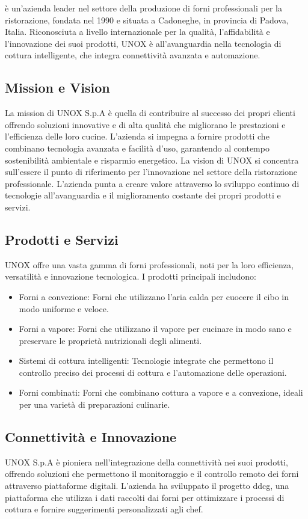 \myAzienda è un'azienda leader nel settore della produzione di forni professionali per la ristorazione, fondata nel 1990 e situata a Cadoneghe, in provincia di Padova, Italia.
Riconosciuta a livello internazionale per la qualità, l'affidabilità e l'innovazione dei suoi prodotti, UNOX è all'avanguardia nella tecnologia di cottura intelligente, che integra connettività avanzata e automazione.

\subsection*{Mission e Vision}
La mission di UNOX S.p.A è quella di contribuire al successo dei propri clienti offrendo soluzioni innovative e di alta qualità che migliorano le prestazioni e l'efficienza delle loro cucine.
L'azienda si impegna a fornire prodotti che combinano tecnologia avanzata e facilità d'uso, garantendo al contempo sostenibilità ambientale e risparmio energetico.
La vision di UNOX si concentra sull'essere il punto di riferimento per l'innovazione nel settore della ristorazione professionale.
L'azienda punta a creare valore attraverso lo sviluppo continuo di tecnologie all'avanguardia e il miglioramento costante dei propri prodotti e servizi.

\subsection*{Prodotti e Servizi}
UNOX offre una vasta gamma di forni professionali, noti per la loro efficienza, versatilità e innovazione tecnologica.
I prodotti principali includono:
\begin{itemize}
    \item Forni a convezione: Forni che utilizzano l'aria calda per cuocere il cibo in modo uniforme e veloce.
    \item Forni a vapore: Forni che utilizzano il vapore per cucinare in modo sano e preservare le proprietà nutrizionali degli alimenti.
    \item Sistemi di cottura intelligenti: Tecnologie integrate che permettono il controllo preciso dei processi di cottura e l'automazione delle operazioni.
    \item Forni combinati: Forni che combinano cottura a vapore e a convezione, ideali per una varietà di preparazioni culinarie.
\end{itemize}

\subsection*{Connettività e Innovazione}
UNOX S.p.A è pioniera nell'integrazione della connettività nei suoi prodotti, offrendo soluzioni che permettono il monitoraggio e il controllo remoto dei forni attraverso piattaforme digitali.
L'azienda ha sviluppato il progetto \gls{ddcg}\glox, una piattaforma che utilizza i dati raccolti dai forni per ottimizzare i processi di cottura e fornire suggerimenti personalizzati agli chef.

